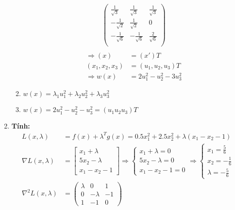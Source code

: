 \begin{enumerate}
\begin{enumerate}
\begin{align*}
\begin{pmatrix}
                \frac{1}{\sqrt{3}} & \frac{1}{\sqrt{3}} & \frac{1}{\sqrt{3}}\\
                -\frac{1}{\sqrt{2}} & \frac{1}{\sqrt{2}} & 0\\
                -\frac{1}{\sqrt{6}} & -\frac{1}{\sqrt{6}} & \frac{2}{\sqrt{6}}\\
            \end{pmatrix}\\
        \end{align*}
        \begin{align*}
            \Rightarrow (x) &= (x')T\\
            (x_1, x_2, x_3) &= (u_1, u_2, u_3)T\\
            \Rightarrow w(x) &= 2u_1^2 - u_2^2 - 3u_3^2
        \end{align*}
        \item $w(x) = \lambda_1u_1^2 + \lambda_2u_2^2 + \lambda_3u_3^2$
        \item $w(x) = 2u_1^2 - u_2^2 - u_3^2 = (u_1u_2u_3)T$
    \end{enumerate}
    \item \textbf{Tính:}\\
    \begin{align*}
        L (x, \lambda) &= f(x) + \lambda^Tg(x) = 0.5x_1^2 + 2.5x_2^2 + \lambda(x_1-x_2-1)\\
        \nabla L (x, \lambda) &= \begin{bmatrix}
            x_1 + \lambda\\
            5x_2 - \lambda\\
            x_1 - x_2 - 1
        \end{bmatrix}\Rightarrow \begin{cases}
            x_1 + \lambda = 0\\
            5x_2 - \lambda = 0\\
            x_1 - x_2 - 1 = 0
        \end{cases} \Rightarrow \begin{cases}
            x_1 = \frac{5}{6}\\
            x_2 = -\frac{1}{6}\\
            \lambda = -\frac{5}{6}
        \end{cases}\\
        \nabla^2 L (x, \lambda) &= \begin{pmatrix}
            \lambda & 0 & 1\\
            0 & -\lambda & -1\\
            1 & -1 & 0
        \end{pmatrix}\\
    \end{align*}
\end{enumerate}





